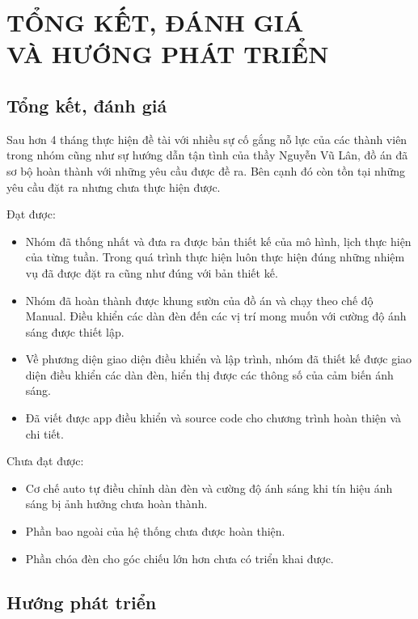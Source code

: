 \chapter{TỔNG KẾT, ĐÁNH GIÁ \\ VÀ HƯỚNG PHÁT TRIỂN}
\section{Tổng kết, đánh giá}
Sau hơn 4 tháng thực hiện đề tài với nhiều sự cố gắng nỗ lực của các thành viên trong nhóm cũng như sự hướng dẫn tận tình của thầy Nguyễn Vũ Lân, đồ án đã sơ bộ hoàn thành với những yêu cầu được đề ra. Bên cạnh đó còn tồn tại những yêu cầu đặt ra nhưng chưa thực  hiện được.

Đạt được:

\begin{itemize}
\item Nhóm đã thống nhất và đưa ra được bản thiết kế của mô hình, lịch thực hiện  của từng tuần. Trong quá trình thực hiện luôn thực hiện đúng những nhiệm vụ đã được đặt ra cũng như đúng với bản thiết kế.
\item Nhóm đã hoàn thành được khung sườn của đồ án và chạy theo chế độ Manual. Điều khiển các dàn đèn đến các vị trí mong muốn với cường độ ánh sáng được thiết lập.
\item Về phương diện giao diện điều khiển và lập trình, nhóm đã thiết kế được giao diện điều khiển các dàn đèn, hiển thị được các thông số của cảm biến ánh sáng.
\item Đã viết được app điều khiển và source code cho chương trình hoàn thiện và chi tiết.

\end{itemize}
Chưa đạt được:
\begin{itemize}
\item Cơ chế auto tự điều chỉnh dàn đèn và cường độ ánh sáng khi tín hiệu ánh sáng bị ảnh hưởng chưa hoàn thành.
\item Phần bao ngoài của hệ thống chưa được hoàn thiện.
\item Phần chóa đèn cho góc chiếu lớn hơn chưa có triển khai được.
\end{itemize}

\section{Hướng phát triển}

